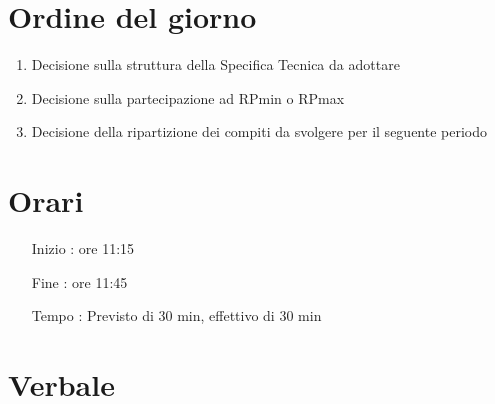 \usepackage[utf8]{inputenc}









\maketitle

\section{Ordine del giorno}

\begin{enumerate}

  \item Decisione sulla struttura della Specifica Tecnica da adottare
  \item Decisione sulla partecipazione ad RPmin o RPmax 
  \item Decisione della ripartizione dei compiti da svolgere per il seguente periodo

\end{enumerate}

\section{Orari}

\begin{itemize}
\item[Inizio]: ore 11:15
\item[Fine]: ore 11:45
\item[Tempo]: Previsto di 30 min, effettivo di 30 min

\end{itemize}

\section{Verbale}

